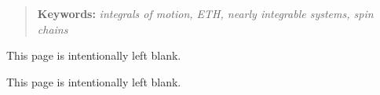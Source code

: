 \documentclass[a4paper,11pt,twoside,openright]{book}
\newcommand*{\blankpage}{%
\vspace*{\fill}
{\centering This page is intentionally left blank.\par}
\vspace{\fill}}
\begin{document}
\pagestyle{tableOfContentStyle}
\vspace*{6cm}
\begin{quotation}
	\noindent \textbf{Keywords:} \textit{integrals of motion, ETH, nearly integrable systems, spin chains}
\end{quotation}
\newpage{}
\blankpage{}
\newpage{}

\pagestyle{tableOfContentStyle}
\tableofcontents
\newpage{}
\blankpage{}
\newpage{}

\pagestyle{custom}
\mainmatter{}



\cleardoublepage{}


\cleardoublepage{}


\cleardoublepage{}
\end{document}
